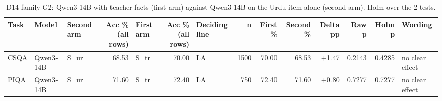 \begin{table}[t]
\centering
\small
\caption{D14 family G2: Qwen3-14B with teacher facts (first arm) against Qwen3-14B on the Urdu item alone (second arm). Holm over the 2 tests.}
\label{tab:d14-method}
\begin{tabular}{lllrlrlrrrrrrl}
\toprule
Task & Model & Second arm & Acc \% (all rows) & First arm & Acc \% (all rows) & Deciding line & n & First \% & Second \% & Delta pp & Raw p & Holm p & Wording \\
\midrule
CSQA & Qwen3-14B & S\_ur & 68.53 & S\_tr & 70.00 & LA & 1500 & 70.00 & 68.53 & +1.47 & 0.2143 & 0.4285 & no clear effect \\
PIQA & Qwen3-14B & S\_ur & 71.60 & S\_tr & 72.40 & LA & 750 & 72.40 & 71.60 & +0.80 & 0.7277 & 0.7277 & no clear effect \\
\bottomrule
\end{tabular}
\end{table}
